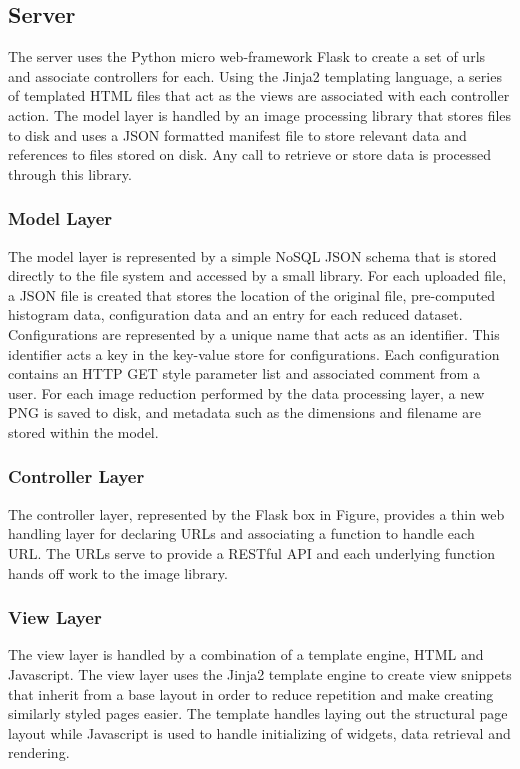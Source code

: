 \documentclass[annual]{acmsiggraph}
\begin{document}
\subsection{Server}
	The server uses the Python micro web-framework Flask to create a set of urls and associate controllers for each.  Using the Jinja2 templating language, a series of templated HTML files that act as the views are associated with each controller action.  The model layer is handled by an image processing library that stores files to disk and uses a JSON formatted manifest file to store relevant data and references to files stored on disk.  Any call to retrieve or store data is processed through this library.

\subsubsection{Model Layer}
	The model layer is represented by a simple NoSQL JSON schema that is stored directly to the file system and accessed by a small library.  For each uploaded file, a JSON file is created that stores the location of the original file, pre-computed histogram data, configuration data and an entry for each reduced dataset.  Configurations are represented by a unique name that acts as an identifier.  This identifier acts a key in the key-value store for configurations.  Each configuration contains an HTTP GET style parameter list and associated comment from a user.  For each image reduction performed by the data processing layer, a new PNG is saved to disk, and metadata such as the dimensions and filename are stored within the model.

\subsubsection{Controller Layer}
	The controller layer, represented by the Flask box in Figure, provides a thin web handling layer for declaring URLs and associating a function to handle each URL.  The URLs serve to provide a RESTful API and each underlying function hands off work to the image library.

\subsubsection{View Layer}
	The view layer is handled by a combination of a template engine, HTML and Javascript.  The view layer uses the Jinja2 template engine to create view snippets that inherit from a base layout in order to reduce repetition and make creating similarly styled pages easier.  The template handles laying out the structural page layout while Javascript is used to handle initializing of widgets, data retrieval and rendering.
\end{document}
